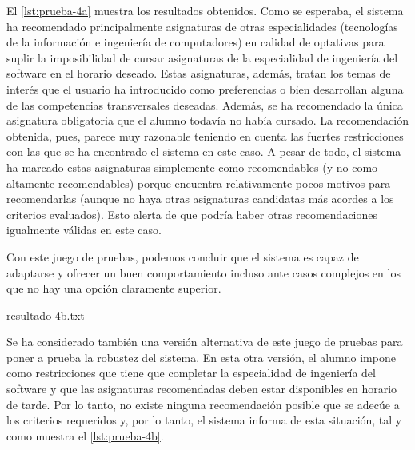El \autoref{lst:prueba-4a} muestra los resultados obtenidos. Como se esperaba, 
el sistema ha recomendado principalmente asignaturas de otras especialidades 
(tecnologías de la información e ingeniería de computadores) en calidad de 
optativas para suplir la imposibilidad de cursar asignaturas de la 
especialidad de ingeniería del software en el horario deseado. Estas 
asignaturas, además, tratan los temas de interés que el usuario ha introducido 
como preferencias o bien desarrollan alguna de las competencias transversales 
deseadas. Además, se ha recomendado la única asignatura obligatoria que el 
alumno todavía no había cursado. La recomendación obtenida, pues, parece muy 
razonable teniendo en cuenta las fuertes restricciones con las que se ha 
encontrado el sistema en este caso. A pesar de todo, el sistema ha marcado 
estas asignaturas simplemente como recomendables (y no como altamente 
recomendables) porque encuentra relativamente pocos motivos para recomendarlas 
(aunque no haya otras asignaturas candidatas más acordes a los criterios 
evaluados). Esto alerta de que podría haber otras recomendaciones igualmente 
válidas en este caso.

Con este juego de pruebas, podemos concluir que el sistema es capaz de 
adaptarse y ofrecer un buen comportamiento incluso ante casos complejos en los 
que no hay una opción claramente superior.

%
    {resultado-4b.txt}

Se ha considerado también una versión alternativa de este juego de pruebas 
para poner a prueba la robustez del sistema. En esta otra versión, el alumno 
impone como restricciones que tiene que completar la especialidad de 
ingeniería del software y que las asignaturas recomendadas deben estar 
disponibles en horario de tarde. Por lo tanto, no existe ninguna recomendación 
posible que se adecúe a los criterios requeridos y, por lo tanto, el sistema 
informa de esta situación, tal y como muestra el \autoref{lst:prueba-4b}.


